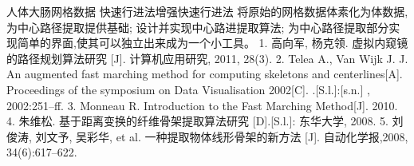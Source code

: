 \assignReq
{人体大肠网格数据}
{快速行进法增强快速行进法}
{}
{}
{}
\assignWork
{将原始的网格数据体素化为体数据,为中心路径提取提供基础;}
{设计并实现中心路进提取算法;}
{为中心路径提取部分实现简单的界面,使其可以独立出来成为一个小工具。}
{}
{}
{}
\assignRef
{1. 高向军, 杨克领. 虚拟内窥镜的路径规划算法研究 [J]. 计算机应用研究, 2011, 28(3).}
{2. Telea A., Van Wijk J. J. An augmented fast marching method for computing }
{skeletons and centerlines[A]. Proceedings of the symposium on Data }
{Visualisation 2002[C]. .[S.l.]:[s.n.] , 2002:251–ff.}
{3. Monneau R. Introduction to the Fast Marching Method[J]. 2010.}
{4. 朱维松. 基于距离变换的纤维骨架提取算法研究 [D].[S.l.]: 东华大学, 2008.}
{5. 刘俊涛, 刘文予, 吴彩华, et al. 一种提取物体线形骨架的新方法 [J].}
{自动化学报,2008, 34(6):617–622.}
